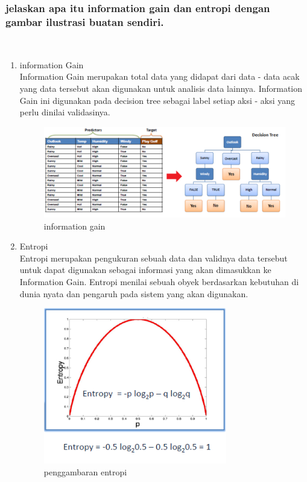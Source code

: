 \subsubsection{jelaskan apa itu information gain dan entropi dengan gambar ilustrasi buatan sendiri.}
\hfill\\
\begin{enumerate}
	\item information Gain
	\hfill\\
	Information Gain merupakan total data yang didapat dari data - data acak yang data tersebut akan digunakan untuk analisis data lainnya. Information Gain ini digunakan pada decision tree sebagai label setiap aksi - aksi yang perlu dinilai validasinya. 
\begin{figure}[H]
    \includegraphics[width=12cm]{figures/1174083/figures2/9.png}
    \centering
    \caption{information gain}
\end{figure}

	\item Entropi
	\hfill\\
	Entropi merupakan pengukuran sebuah data dan validnya data tersebut untuk dapat digunakan sebagai informasi yang akan dimasukkan ke Information Gain. Entropi menilai sebuah obyek berdasarkan kebutuhan di dunia nyata dan pengaruh pada sistem yang akan digunakan.
\begin{figure}[H]
    \includegraphics[width=8cm]{figures/1174083/figures2/10.png}
    \centering
    \caption{penggambaran entropi}
\end{figure}
\end{enumerate}



